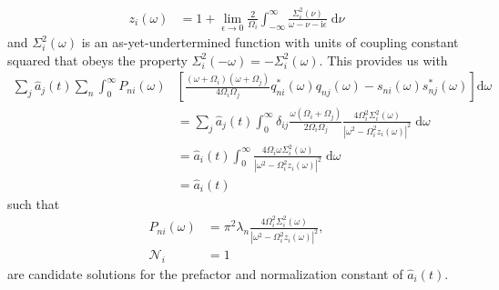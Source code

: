 \begin{equation}
\begin{split}
z_i(\omega) &= 1 + \lim_{\epsilon\to0}\frac{2}{\Omega_i}\int_{-\infty}^{\infty}\frac{\Sigma_i^2(\nu)}{\omega - \nu - \mathrm{i}\epsilon}\;\mathrm{d}\nu
\end{split}
\end{equation}
and $\Sigma_i^2(\omega)$ is an as-yet-undertermined function with units of coupling constant squared that obeys the property $\Sigma_i^2(-\omega) = -\Sigma_i^2(\omega)$. This provides us with
\begin{equation}
\begin{split}
\sum_j\hat{a}_j(t)\sum_n\int_0^\infty P_{ni}(\omega)&\left[\frac{(\omega + \Omega_i)(\omega + \Omega_j)}{4\Omega_i\Omega_j}q_{ni}^*(\omega)q_{nj}(\omega) - s_{ni}(\omega)s_{nj}^*(\omega)\right]\mathrm{d}\omega\\
&= \sum_j\hat{a}_j(t)\int_0^\infty\delta_{ij}\frac{\omega(\Omega_i + \Omega_j)}{2\Omega_i\Omega_j}\frac{4\Omega_i^2\Sigma_i^2(\omega)}{|\omega^2 - \Omega_i^2z_i(\omega)|^2}\;\mathrm{d}\omega\\
&= \hat{a}_i(t)\int_0^\infty\frac{4\Omega_i\omega\Sigma_i^2(\omega)}{|\omega^2 - \Omega_i^2z_i(\omega)|^2}\;\mathrm{d}\omega\\
&= \hat{a}_i(t)
\end{split}
\end{equation}
such that
\begin{equation}
\begin{split}
P_{ni}(\omega) &= \pi^2\lambda_n\frac{4\Omega_i^2\Sigma_i^2(\omega)}{|\omega^2 - \Omega_i^2z_i(\omega)|^2},\\
\mathcal{N}_i &= 1
\end{split}
\end{equation}
are candidate solutions for the prefactor and normalization constant of $\hat{a}_i(t)$.

